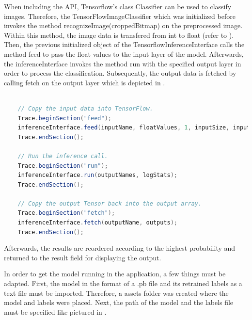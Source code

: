 When including the API, Tensorflow's class Classifier can be used to classify images. Therefore, the TensorFlowImageClassifier which was initialized before invokes the method recognizeImage(croppedBitmap) on the preprocessed image. Within this method, the image data is transfered from int to float (refer to ). Then, the previous initialized object of the TensorflowInferenceInterface calls the method feed to pass the float values to the input layer of the model. Afterwards, the inferenceInterface invokes the method run with the specified output layer in order to process the classification. Subsequently, the output data is fetched by calling fetch on the output layer which is depicted in .

\begin{minipage}{\linewidth}
\begin{lstlisting}[caption=Classifying images by the inferenceInterface \citep{TensorflowDemo}, label=list:classify_android, language=java]

    // Copy the input data into TensorFlow.
    Trace.beginSection("feed");
    inferenceInterface.feed(inputName, floatValues, 1, inputSize, inputSize, 3);
    Trace.endSection();

    // Run the inference call.
    Trace.beginSection("run");
    inferenceInterface.run(outputNames, logStats);
    Trace.endSection();

    // Copy the output Tensor back into the output array.
    Trace.beginSection("fetch");
    inferenceInterface.fetch(outputName, outputs);
    Trace.endSection();
\end{lstlisting}
\end{minipage}

Afterwards, the results are reordered according to the highest probability and returned to the result field for displaying the output.

In order to get the model running in the application, a few things must be adapted. First, the model in the format of a .pb file and its retrained labels as a text file must be imported. Therefore, a assets folder was created where the model and labels were placed. Next, the path of the model and the labels file must be specified like pictured in .

